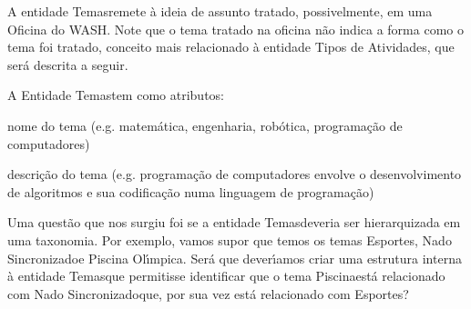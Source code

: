 \documentclass[
12pt,		%
openright,	%
twoside,  %
a4paper,			%
chapter=TITLE,		%
english,			%
french,				%
spanish,			%
brazil				%
]{USPSC-classe/USPSC}
\begin{document}
\noindent\begin{center}\mbox{\centering{}}\end{center}


A entidade \textquotedbl Temas\textquotedbl  remete \`a ideia de assunto tratado, possivelmente, em uma Oficina do WASH. Note que o tema tratado na oficina n\~ao indica a forma como o tema foi tratado, conceito mais relacionado \`a entidade \textquotedbl Tipos de Atividades\textquotedbl , que ser\'a descrita a seguir.










A Entidade \textquotedbl Temas\textquotedbl  tem como atributos:











\begin{alineas}
\item nome do tema (e.g. matem\'atica, engenharia, rob\'otica, programa\c{c}\~ao de computadores)
\item descri\c{c}\~ao do tema (e.g. \textquotedbl programa\c{c}\~ao de computadores envolve o desenvolvimento de algoritmos e sua codifica\c{c}\~ao numa linguagem de programa\c{c}\~ao\textquotedbl )
\end{alineas}

Uma quest\~ao que nos surgiu foi se a entidade \textquotedbl Temas\textquotedbl  deveria ser hierarquizada em uma taxonomia. Por exemplo, vamos supor que temos os temas \textquotedbl Esportes\textquotedbl , \textquotedbl Nado Sincronizado\textquotedbl  e \textquotedbl Piscina Ol\'{\i}mpica\textquotedbl . Ser\'a que dever\'{\i}amos criar uma estrutura interna \`a entidade \textquotedbl Temas\textquotedbl  que permitisse identificar que o tema \textquotedbl Piscina\textquotedbl  est\'a relacionado com \textquotedbl Nado Sincronizado\textquotedbl  que, por sua vez est\'a relacionado com \textquotedbl Esportes\textquotedbl ?
\end{document}
